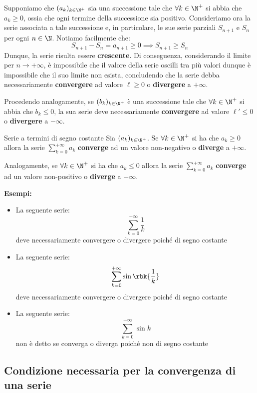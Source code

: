 \documentclass[a4paper, 12pt]{report}
\begin{document}
    Supponiamo che $(a_k)_{k \in \N^+}$ sia una successione tale che $\forall k \in \N^+$ si abbia che $a_{k} \geq 0$, ossia che ogni termine della successione sia positivo. Consideriamo ora la serie associata a tale successione e, in particolare, le sue serie parziali $S_{n+1}$ e $S_n$ per ogni $n \in \N$. Notiamo facilmente che:
    \[S_{n+1} - S_n = a_{n+1} \geq 0 \implies S_{n+1} \geq S_n\]
    Dunque, la serie risulta essere \textbf{crescente}. Di conseguenza, considerando il limite per $n \to +\infty$, è impossibile che il valore della serie oscilli tra più valori dunque è impossibile che il suo limite non esista, concludendo che la serie debba necessariamente \textbf{convergere} ad valore $\ell \geq 0$ o \textbf{divergere} a $+\infty$.

    Procedendo analogamente, se $(b_k)_{k \in \N^+}$ è una successione tale che $\forall k \in \N^+$ si abbia che $b_k \leq 0$, la sua serie deve necessariamente \textbf{convergere} ad valore $\ell' \leq 0$ o \textbf{divergere} a $-\infty$.

    \begin{framedthm}{Serie a termini di segno costante}
        Sia $(a_k)_{k \in \N^+}$. Se $\forall k \in \N^+$ si ha che $a_k \geq 0$ allora la serie $\sum\limits_{k = 0}^{+\infty} a_k$ \textbf{converge} ad un valore non-negativo o \textbf{diverge} a $+\infty$.
        
        Analogamente, se $\forall k \in \N^+$ si ha che $a_k \leq 0$ allora la serie $\sum\limits_{k = 0}^{+\infty} a_k$ \textbf{converge} ad un valore non-positivo o \textbf{diverge} a $-\infty$.
    \end{framedthm}

    \textbf{Esempi:}

    \begin{itemize}
        \item La seguente serie:
        \[\sum_{k = 0}^{+\infty} \frac{1}{k}\]
        deve necessariamente convergere o divergere poiché di segno costante
        \item La seguente serie:
        \[\sum_{k = 0}^{+\infty} \sin \rbk{\frac{1}{k}}\]
        deve necessariamente convergere o divergere poiché di segno costante
        \item La seguente serie:
        \[\sum_{k = 0}^{+\infty} \sin k\]
        non è detto se converga o diverga poiché non di segno costante
    \end{itemize}

    \quad

    \subsection{Condizione necessaria per la convergenza di una serie}
    
\end{document}
